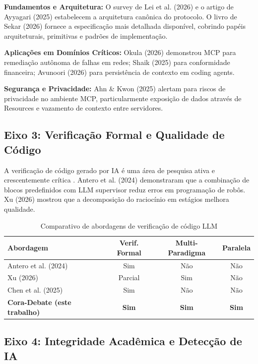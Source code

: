 \documentclass[12pt,a4paper,sumario=tradicional]{abntex2}
\begin{document}
\textbf{Fundamentos e Arquitetura:} O survey de Lei et al. (2026) \cite{lei2026survey} e o artigo de Ayyagari (2025) \cite{ayyagari2025mcp} estabelecem a arquitetura canônica do protocolo. O livro de Sekar (2026) \cite{sekarmcp2026} fornece a especificação mais detalhada disponível, cobrindo papéis arquiteturais, primitivas e padrões de implementação.

\textbf{Aplicações em Domínios Críticos:} Okula (2026) \cite{okula2026era} demonstrou MCP para remediação autônoma de falhas em redes; Shaik (2025) \cite{shaik2025cbi} para conformidade financeira; Avunoori (2026) \cite{avunoori2026aesp} para persistência de contexto em coding agents.

\textbf{Segurança e Privacidade:} Ahn \& Kwon (2025) \cite{ahn2025privacy} alertam para riscos de privacidade no ambiente MCP, particularmente exposição de dados através de Resources e vazamento de contexto entre servidores.

\subsection{Eixo 3: Verificação Formal e Qualidade de Código}

A verificação de código gerado por IA é uma área de pesquisa ativa e crescentemente crítica \cite{antero2024harnessing}. Antero et al. (2024) demonstraram que a combinação de blocos predefinidos com LLM supervisor reduz erros em programação de robôs. Xu (2026) \cite{xu2026optimisation} mostrou que a decomposição do raciocínio em estágios melhora qualidade.

\begin{table}[H]
\centering
\caption{Comparativo de abordagens de verificação de código LLM}
\label{tab:verification-compare}
\begin{tabular}{@{}lccc@{}}
\toprule
\textbf{Abordagem} & \textbf{Verif. Formal} & \textbf{Multi-Paradigma} & \textbf{Paralela} \\
\midrule
Antero et al. (2024) & Sim & Não & Não \\
Xu (2026) & Parcial & Sim & Não \\
Chen et al. (2025) & Sim & Não & Não \\
\textbf{Cora-Debate (este trabalho)} & \textbf{Sim} & \textbf{Sim} & \textbf{Sim} \\
\bottomrule
\end{tabular}
\end{table}

\subsection{Eixo 4: Integridade Acadêmica e Detecção de IA}
\end{document}

